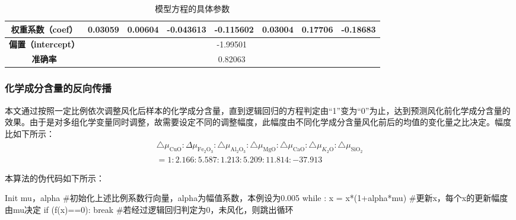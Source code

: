 \documentclass[withoutpreface,bwprint]{cumcmthesis} %
\begin{document}
\begin{itemize}
	\begin{table}[!h]
		\centering
		\small
		\caption{模型方程的具体参数}
		\label{canshu}
		\begin{tabular}{|c|ccccccc|}
			\hline
			\textbf{权重系数（coef）}    & \multicolumn{1}{c|}{0.03059} & \multicolumn{1}{c|}{0.00604} & \multicolumn{1}{c|}{-0.043613} & \multicolumn{1}{c|}{-0.115602} & \multicolumn{1}{c|}{0.03004} & \multicolumn{1}{c|}{0.17706} & -0.18683 \\ \hline
			\textbf{偏置（intercept）} & \multicolumn{7}{c|}{-1.99501}                                                                                                                                                                          \\ \hline
			\textbf{准确率}           & \multicolumn{7}{c|}{0.82063}                                                                                                                                                                           \\ \hline
		\end{tabular}
	\end{table}
	
\end{itemize}

\subsubsection{化学成分含量的反向传播}

本文通过按照一定比例依次调整风化后样本的化学成分含量，直到逻辑回归的方程判定由“1”变为“0”为止，达到预测风化前化学成分含量的效果。由于是对多组化学变量同时调整，故需要设定不同的调整幅度，此幅度由不同化学成分含量风化前后的均值的变化量之比决定。幅度比如下所示： 
\[
\begin{array}{l}
	\triangle \mu_{\mathrm{CuO}}: \Delta \mu_{\mathrm{Fe}_{2} \mathrm{O}_{3}}: \triangle \mu_{\mathrm{Al}_{2} \mathrm{O}_{3}}: \triangle \mu_{\mathrm{MgO}}: \triangle \mu_{\mathrm{CaO}}: \triangle \mu_{K_{2} \mathrm{O}}: \triangle \mu_{\mathrm{SiO}_{2}} \\
	=1: 2.166: 5.587: 1.213: 5.209: 11.814:-37.913
\end{array}
\]

本算法的伪代码如下所示：

\begin{python}
	Init mu，alpha       #初始化上述比例系数行向量，alpha为幅值系数，本例设为0.005
	while :
	x = x*(1+alpha*mu) #更新x，每个x的更新幅度由mu决定
	if (f(x)==0):
	break            #若经过逻辑回归判定为0，未风化，则跳出循环
\end{python}
\end{document}
